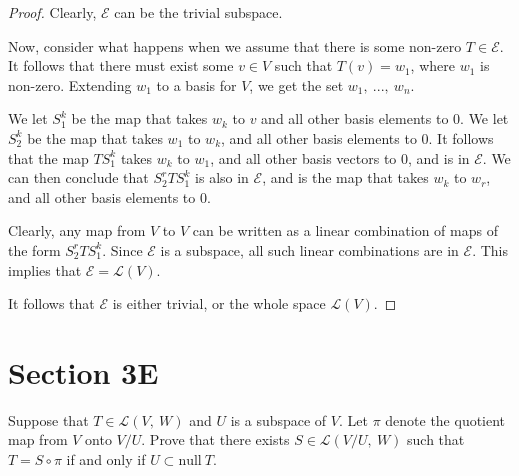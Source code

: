 \documentclass[10pt, oneside]{article}
\newenvironment{problem}[2][Problem]{\begin{trivlist}
\item[\hskip \labelsep {\bfseries #1}\hskip \labelsep {\bfseries #2.}]}{\end{trivlist}}
\begin{document}
    \begin{proof}

      Clearly, $\mathcal{E}$ can be the trivial subspace.
      \newline

      Now, consider what happens when we assume that there is some non-zero $T \in \mathcal{E}$. It follows that there must exist some $v \in V$ such that
      $T(v) = w_1$, where $w_1$ is non-zero. Extending $w_1$ to a basis for $V$, we get the set $w_1, \ ..., \ w_n$.
      \newline

      We let $S^k_1$ be the map that takes $w_k$ to $v$ and all other basis elements to $0$. We let $S^k_2$ be the map that takes $w_1$ to $w_k$, and all other
      basis elements to $0$. It follows that the map $T S^k_1$ takes $w_k$ to $w_1$, and all other basis vectors to $0$, and is in $\mathcal{E}$. We can then conclude that
      $S^r_2 T S^k_1$ is also in $\mathcal{E}$, and is the map that takes $w_k$ to $w_r$, and all other basis elements to $0$.
      \newline

      Clearly, any map from $V$ to $V$ can be written as a linear combination of maps of the form $S^r_2 T S^k_1$. Since $\mathcal{E}$ is a subspace, all such
      linear combinations are in $\mathcal{E}$. This implies that $\mathcal{E} = \mathcal{L}(V)$.
      \newline

      It follows that $\mathcal{E}$ is either trivial, or the whole space $\mathcal{L}(V)$.
      \end{proof}

  \section{Section 3E}
    
    \begin{problem}{3.18}

      Suppose that $T \in \mathcal{L}(V, \ W)$ and $U$ is a subspace of $V$. Let $\pi$ denote the quotient map from $V$ onto $V/U$.
      Prove that there exists $S \in \mathcal{L}(V/U, \ W)$ such that $T = S \circ \pi$ if and only if $U \subset \text{null} \ T$.

    \end{problem}
\end{document}
